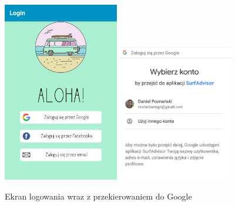 \begin{figure}[h!]
	\begin{center}
		\includegraphics[width=0.45\textwidth]{img/mobile/login}
		\hspace{5mm}
		\includegraphics[width=0.45\textwidth]{img/mobile/google}
	\end{center}
	\caption{Ekran logowania wraz z przekierowaniem do Google}
\end{figure}

